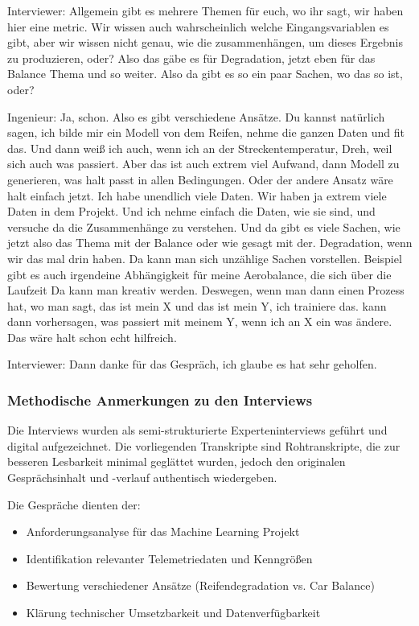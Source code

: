 Interviewer:
Allgemein gibt es mehrere Themen für euch, wo ihr sagt, wir haben hier eine metric. Wir wissen auch wahrscheinlich welche Eingangsvariablen es gibt, aber wir wissen nicht genau, wie die zusammenhängen, um dieses Ergebnis zu produzieren, oder? Also das gäbe es für Degradation, jetzt eben für das Balance Thema und so weiter. Also da gibt es so ein paar Sachen, wo das so ist, oder? 

Ingenieur:
Ja, schon. Also es gibt verschiedene Ansätze. Du kannst natürlich sagen, ich bilde mir ein Modell von dem Reifen, nehme die ganzen Daten und fit das. Und dann weiß ich auch, wenn ich an der Streckentemperatur, Dreh, weil sich auch was passiert. Aber das ist auch extrem viel Aufwand, dann Modell zu generieren, was halt passt in allen Bedingungen. Oder der andere Ansatz wäre halt einfach jetzt. Ich habe unendlich viele Daten. Wir haben ja extrem viele Daten in dem Projekt. Und ich nehme einfach die Daten, wie sie sind, und versuche da die Zusammenhänge zu verstehen. Und  da gibt es viele Sachen, wie jetzt  also das Thema mit der Balance oder wie gesagt mit der. Degradation, wenn wir das mal drin haben. Da kann man sich unzählige Sachen vorstellen. Beispiel gibt es auch irgendeine Abhängigkeit für meine Aerobalance, die sich über die Laufzeit Da kann man kreativ werden. Deswegen, wenn man dann einen Prozess hat, wo man sagt, das ist mein X und das ist mein Y, ich trainiere das.  kann dann vorhersagen, was passiert mit meinem Y, wenn ich an X ein was ändere. Das wäre halt schon echt hilfreich. 

Interviewer: 
Dann danke für das Gespräch, ich glaube es hat sehr geholfen.

\nolinenumbers

\subsubsection{Methodische Anmerkungen zu den Interviews}

Die Interviews wurden als semi-strukturierte Experteninterviews geführt und digital aufgezeichnet. Die vorliegenden Transkripte sind Rohtranskripte, die zur besseren Lesbarkeit minimal geglättet wurden, jedoch den originalen Gesprächsinhalt und -verlauf authentisch wiedergeben.

Die Gespräche dienten der:
\begin{itemize}
    \item Anforderungsanalyse für das Machine Learning Projekt
    \item Identifikation relevanter Telemetriedaten und Kenngrößen
    \item Bewertung verschiedener Ansätze (Reifendegradation vs. Car Balance)
    \item Klärung technischer Umsetzbarkeit und Datenverfügbarkeit
\end{itemize}